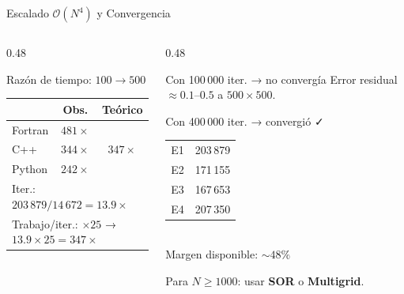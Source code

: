 \documentclass[aspectratio=169, 11pt]{beamer}
\begin{document}
\begin{frame}{Escalado $\mathcal{O}(N^4)$ y Convergencia}
  \begin{columns}[T]
    \begin{column}{0.48\textwidth}
      \begin{block}{Razón de tiempo: $100\to500$}
        \begin{tabular}{lcc}
          \toprule
          & \textbf{Obs.} & \textbf{Teórico} \\
          \midrule
          Fortran & $481\times$ & \multirow{3}{*}{$347\times$} \\
          C++     & $344\times$ & \\
          Python  & $242\times$ & \\
          \bottomrule
          \multicolumn{3}{l}{\small Iter.: $203\,879/14\,672 = 13.9\times$} \\
          \multicolumn{3}{l}{\small Trabajo/iter.: $\times25$ → $13.9\times25=347\times$} \\
        \end{tabular}
      \end{block}
    \end{column}
    \begin{column}{0.48\textwidth}
      \begin{alertblock}{Con 100\,000 iter. → no convergía}
        Error residual $\approx 0.1$–$0.5$ a $500\times500$.
      \end{alertblock}
      \vspace{0.2cm}
      \begin{exampleblock}{Con 400\,000 iter. → convergió ✓}
        \begin{tabular}{lc}
          E1 & 203\,879 \\
          E2 & 171\,155 \\
          E3 & 167\,653 \\
          E4 & 207\,350 \\
        \end{tabular}\\[0.1cm]
        Margen disponible: $\sim48\%$
      \end{exampleblock}
      \vspace{0.15cm}
      {\small Para $N\geq1000$: usar \textbf{SOR} o \textbf{Multigrid}.}
    \end{column}
  \end{columns}
\end{frame}

\end{document}
